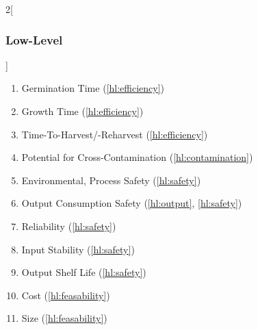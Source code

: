 \documentclass{../tex/report}
\begin{document}
\begin{multicols}{2}[\subsubsection{Low-Level}\label{sec:llos}]
\begin{enumerate}[label=LL\arabic*., ref=LL\arabic*]
        \item \label{ll:time_germination} Germination Time \hfill (\ref{hl:efficiency})
        \item \label{ll:time_growth} Growth Time \hfill (\ref{hl:efficiency})
        \item \label{ll:time_harvest} Time-To-Harvest/-Reharvest \hfill (\ref{hl:efficiency})
        \item \label{ll:crosscontamination} Potential for Cross-Contamination \hfill (\ref{hl:contamination})
        \item \label{ll:safety_process} Environmental, Process Safety \hfill (\ref{hl:safety})
        \item \label{ll:output_safety} Output Consumption Safety \hfill (\ref{hl:output}, \ref{hl:safety})
        \item \label{ll:reliability} Reliability \hfill (\ref{hl:safety})
        \item \label{ll:stability_input} Input Stability \hfill (\ref{hl:safety})
        \item \label{ll:stability_output} Output Shelf Life \hfill (\ref{hl:safety})
        \item \label{ll:cost} Cost \hfill (\ref{hl:feasability})
        \item \label{ll:size} Size \hfill (\ref{hl:feasability})
    \end{enumerate}
\end{multicols}
\end{document}
